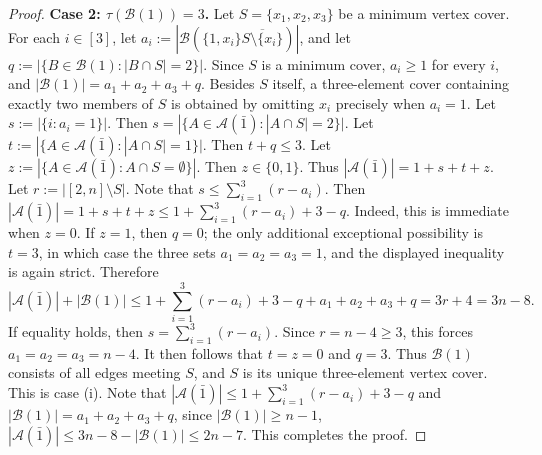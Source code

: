 \documentclass[a4paper,11pt]{article}
\newcommand{\m}{\mathcal}
\begin{document}
\begin{proof}
{\bf Case 2: $\tau(\m B(1))=3$.}
Let $S=\{x_1,x_2,x_3\}$ 
be a minimum vertex cover. 
For each $i\in[3]$, let $a_i:=|\m B(\{1,x_i\}\overline{S\setminus \{x_i\}})|$, and let $q:=|\{B\in \m B(1): |B\cap S|=2\}|$.
Since $S$ is a minimum cover, $a_i\ge1$ for every $i$, and $|\m B(1)|=a_1+a_2+a_3+q.$
Besides $S$ itself, a three-element cover containing exactly two members of $S$ is obtained by omitting $x_i$ precisely when $a_i=1$. Let $s:=|\{i:a_i=1\}|$. Then $s=|\{A\in \m A(\bar1): |A\cap S|=2\}|$.
Let $t:=|\{A\in \m A(\bar1): |A\cap S|=1\}|$.
Then $t+q\le 3$.
Let $z:=|\{A\in \m A(\bar1): A\cap S=\emptyset\}|$. Then $z\in\{0,1\}$.
Thus $|\m A(\bar1)|=1+s+t+z$.
Let $r:=|[2,n]\setminus S|$. Note that $s\le\sum_{i=1}^3(r-a_i).$ 
Then $|\m A(\bar1)|=1+s+t+z \le 1+ \sum_{i=1}^3(r-a_i)+3-q.$
Indeed, this is immediate when $z=0$. If $z=1$, then $q=0$; the only additional exceptional possibility is $t=3$, in which case the three sets $a_1=a_2=a_3=1$, and the displayed inequality is again strict.
Therefore 
\[
|\m A(\bar1)|+|\m B(1)|\le 1+ \sum_{i=1}^3(r-a_i)+3-q+a_1+a_2+a_3+q=3r+4=3n-8.
\]
If equality holds, then $s=\sum_{i=1}^3(r-a_i).$ 
Since $r=n-4\ge3$, this forces $a_1=a_2=a_3=n-4.$
It then follows that $t=z=0$ and $q=3$. Thus $\m B(1)$ consists of all
edges meeting $S$, and $S$ is its unique three-element vertex cover.
This is case \rm(i).
Note that $|\m A(\bar1)|\le 1+ \sum_{i=1}^3(r-a_i)+3-q$ and $|\m B(1)|=a_1+a_2+a_3+q$, since $|\m B(1)|\ge n-1$, $|\m A(\bar1)|\le 3n-8-|\m B(1)|\le 2n-7$.
This completes the proof.
\end{proof}
\end{document}
